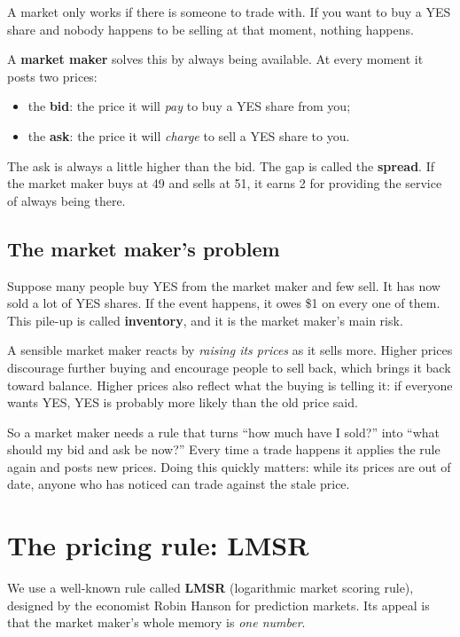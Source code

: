 \documentclass[11pt]{article}
\newcommand{\cent}{\textcent}
\begin{document}
A market only works if there is someone to trade with. If you want to buy a
YES share and nobody happens to be selling at that moment, nothing happens.

A \textbf{market maker} solves this by always being available. At every moment
it posts two prices:

\begin{itemize}
  \item the \textbf{bid}: the price it will \emph{pay} to buy a YES share from you;
  \item the \textbf{ask}: the price it will \emph{charge} to sell a YES share to you.
\end{itemize}

The ask is always a little higher than the bid. The gap is called the
\textbf{spread}. If the market maker buys at 49\cent{} and sells at 51\cent{},
it earns 2\cent{} for providing the service of always being there.

\subsection{The market maker's problem}

Suppose many people buy YES from the market maker and few sell. It has now
sold a lot of YES shares. If the event happens, it owes \$1 on every one of
them. This pile-up is called \textbf{inventory}, and it is the market maker's
main risk.

A sensible market maker reacts by \emph{raising its prices} as it sells more.
Higher prices discourage further buying and encourage people to sell back,
which brings it back toward balance. Higher prices also reflect what the
buying is telling it: if everyone wants YES, YES is probably more likely than
the old price said.

So a market maker needs a rule that turns ``how much have I sold?'' into
``what should my bid and ask be now?'' Every time a trade happens it applies
the rule again and posts new prices. Doing this quickly matters: while its
prices are out of date, anyone who has noticed can trade against the stale
price.

\section{The pricing rule: LMSR}

We use a well-known rule called \textbf{LMSR} (logarithmic market scoring
rule), designed by the economist Robin Hanson for prediction markets. Its
appeal is that the market maker's whole memory is \emph{one number}.
\end{document}
